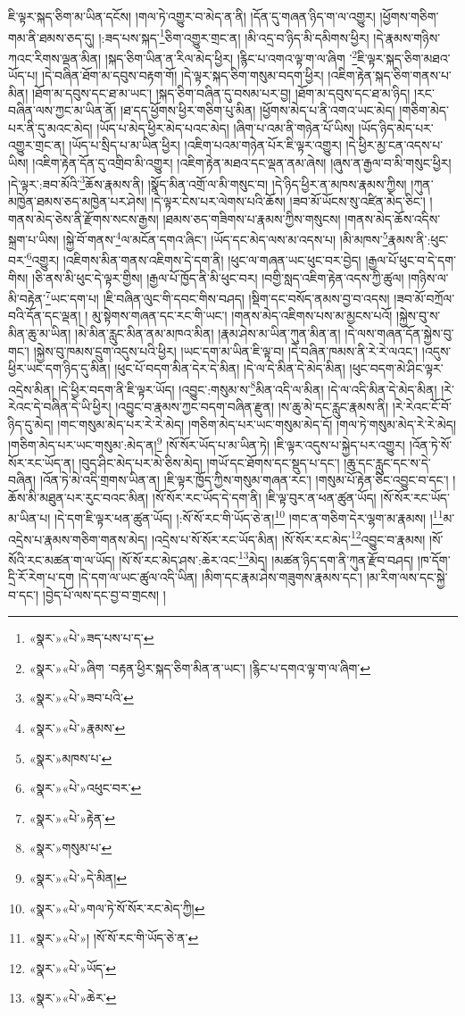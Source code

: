 ཇི་ལྟར་སྐད་ཅིག་མ་ཡིན་དངོས། །གལ་ཏེ་འགྱུར་བ་མེད་ན་ནི། །དོན་དུ་གཞན་ཉིད་ག་ལ་འགྱུར། །ཕྱོགས་གཅིག་གམ་ནི་ཐམས་ཅད་དུ། །:ཟད་པས་སྐད་\footnote{«སྣར་»«པེ་»ཟད་པས་པ་ད་}ཅིག་འགྱུར་གྲང་ན། །མི་འདྲ་བ་ཉིད་མི་དམིགས་ཕྱིར། །དེ་རྣམས་གཉིས་ཀའང་རིགས་ལྡན་མིན། །སྐད་ཅིག་ཡིན་ན་རིལ་མེད་ཕྱིར། །རྙིང་པ་འགའ་ལྟ་ག་ལ་ཞིག ་\footnote{«སྣར་»«པེ་»ཞིག ་བརྟན་ཕྱིར་སྐད་ཅིག་མིན་ན་ཡང་། །རྙིང་པ་དགའ་ལྟ་ག་ལ་ཞིག་}ཇི་ལྟར་སྐད་ཅིག་མཐའ་ཡོད་པ། །དེ་བཞིན་ཐོག་མ་དབུས་བརྟག་གོ། །དེ་ལྟར་སྐད་ཅིག་གསུམ་བདག་ཕྱིར། །འཇིག་རྟེན་སྐད་ཅིག་གནས་པ་མིན། །ཐོག་མ་དབུས་དང་ཐ་མ་ཡང་། །སྐད་ཅིག་བཞིན་དུ་བསམ་པར་བྱ། །ཐོག་མ་དབུས་དང་ཐ་མ་ཉིད། །རང་བཞིན་ལས་ཀྱང་མ་ཡིན་ནོ། །ཐ་དད་ཕྱོགས་ཕྱིར་གཅིག་པུ་མིན། །ཕྱོགས་མེད་པ་ནི་འགའ་ཡང་མེད། །གཅིག་མེད་པར་ནི་དུ་མའང་མེད། །ཡོད་པ་མེད་ཕྱིར་མེད་པའང་མེད། །ཞིག་པ་འམ་ནི་གཉེན་པོ་ཡིས། །ཡོད་ཉིད་མེད་པར་འགྱུར་གྲང་ན། །ཡོད་པ་སྲིད་པ་མ་ཡིན་ཕྱིར། །འཇིག་པའམ་གཉེན་པོར་ཇི་ལྟར་འགྱུར། །དེ་ཕྱིར་མྱ་ངན་འདས་པ་ཡིས། །འཇིག་རྟེན་དོན་དུ་འགྲིབ་མི་འགྱུར། །འཇིག་རྟེན་མཐའ་དང་ལྡན་ནམ་ཞེས། །ཞུས་ན་རྒྱལ་བ་མི་གསུང་ཕྱིར། །དེ་ལྟར་:ཟབ་མོའི་\footnote{«སྣར་»«པེ་»ཟབ་པའི་}ཆོས་རྣམས་ནི། །སྣོད་མིན་འགྲོ་ལ་མི་གསུང་བ། །དེ་ཉིད་ཕྱིར་ན་མཁས་རྣམས་ཀྱིས། །ཀུན་མཁྱེན་ཐམས་ཅད་མཁྱེན་པར་ཤེས། །དེ་ལྟར་ངེས་པར་ལེགས་པའི་ཆོས། །ཟབ་མོ་ཡོངས་སུ་འཛིན་མེད་ཅིང་། །གནས་མེད་ཅེས་ནི་རྫོགས་སངས་རྒྱས། །ཐམས་ཅད་གཟིགས་པ་རྣམས་ཀྱིས་གསུངས། །གནས་མེད་ཆོས་འདིས་སྐྲག་པ་ཡིས། །སྐྱེ་བོ་གནས་\footnote{«སྣར་»«པེ་»རྣམས་}ལ་མངོན་དགའ་ཞིང་། །ཡོད་དང་མེད་ལས་མ་འདས་པ། །མི་མཁས་\footnote{«སྣར་»མཁས་པ་}རྣམས་ནི་:ཕུང་བར་\footnote{«སྣར་»«པེ་»འཕུང་བར་}འགྱུར། །འཇིགས་མིན་གནས་འཇིགས་དེ་དག་ནི། །ཕུང་ལ་གཞན་ཡང་ཕུང་བར་བྱེད། །རྒྱལ་པོ་ཕུང་བ་དེ་དག་གིས། །ཅི་ནས་མི་ཕུང་དེ་ལྟར་གྱིས། །རྒྱལ་པོ་ཁྱོད་ནི་མི་ཕུང་བར། །བགྱི་སླད་འཇིག་རྟེན་འདས་ཀྱི་ཚུལ། །གཉིས་ལ་མི་བརྟེན་\footnote{«སྣར་»«པེ་»རྟེན་}ཡང་དག་པ། །ཇི་བཞིན་ལུང་གི་དབང་གིས་བཤད། །སྡིག་དང་བསོད་ནམས་བྱ་བ་འདས། །ཟབ་མོ་བཀྲོལ་བའི་དོན་དང་ལྡན། །
མུ་སྟེགས་གཞན་དང་རང་གི་ཡང་། །གནས་མེད་འཇིགས་པས་མ་མྱངས་པའོ། །སྐྱེས་བུ་ས་མིན་ཆུ་མ་ཡིན། །མེ་མིན་རླུང་མིན་ནམ་མཁའ་མིན། །རྣམ་ཤེས་མ་ཡིན་ཀུན་མིན་ན། །དེ་ལས་གཞན་དོན་སྐྱེས་བུ་གང་། །སྐྱེས་བུ་ཁམས་དྲུག་འདུས་པའི་ཕྱིར། །ཡང་དག་མ་ཡིན་ཇི་ལྟ་བ། །དེ་བཞིན་ཁམས་ནི་རེ་རེ་ལའང་། །འདུས་ཕྱིར་ཡང་དག་ཉིད་དུ་མིན། །ཕུང་པོ་བདག་མིན་དེར་དེ་མིན། །དེ་ལ་དེ་མིན་དེ་མེད་མིན། །ཕུང་བདག་མེ་ཤིང་ལྟར་འདྲེས་མིན། །དེ་ཕྱིར་བདག་ནི་ཇི་ལྟར་ཡོད། །འབྱུང་:གསུམ་ས་\footnote{«སྣར་»གསུམ་པ་}མིན་འདི་ལ་མིན། །དེ་ལ་འདི་མིན་དེ་མེད་མིན། །རེ་རེའང་དེ་བཞིན་དེ་ཡི་ཕྱིར། །འབྱུང་བ་རྣམས་ཀྱང་བདག་བཞིན་རྫུན། །ས་ཆུ་མེ་དང་རླུང་རྣམས་ནི། །རེ་རེའང་ངོ་བོ་ཉིད་དུ་མེད། །གང་གསུམ་མེད་པར་རེ་རེ་མེད། །གཅིག་མེད་པར་ཡང་གསུམ་མེད་དོ། །གལ་ཏེ་གསུམ་མེད་རེ་རེ་མེད། །གཅིག་མེད་པར་ཡང་གསུམ་:མེད་ན།\footnote{«སྣར་»«པེ་»དེ་མིན།} །སོ་སོར་ཡོད་པ་མ་ཡིན་ཏེ། །ཇི་ལྟར་འདུས་པ་སྐྱེད་པར་འགྱུར། །འོན་ཏེ་སོ་སོར་རང་ཡོད་ན། །བུད་ཤིང་མེད་པར་མེ་ཅིས་མེད། །གཡོ་དང་ཐོགས་དང་སྡུད་པ་དང་། །ཆུ་དང་རླུང་དང་ས་དེ་བཞིན། །འོན་ཏེ་མེ་འདི་གྲགས་ཡིན་ན། །ཇི་ལྟར་ཁྱོད་ཀྱིས་གསུམ་གཞན་རང་། །གསུམ་པོ་རྟེན་ཅིང་འབྱུང་བ་དང་། །ཆོས་མི་མཐུན་པར་རུང་བའང་མིན། །སོ་སོར་རང་ཡོད་དེ་དག་ནི། །ཇི་ལྟ་བུར་ན་ཕན་ཚུན་ཡོད། །སོ་སོར་རང་ཡོད་མ་ཡིན་པ། །དེ་དག་ཇི་ལྟར་ཕན་ཚུན་ཡོད། །:སོ་སོ་རང་གི་ཡོད་ཅེ་ན།\footnote{«སྣར་»«པེ་»གལ་ཏེ་སོ་སོར་རང་མེད་ཀྱི།} །གང་ན་གཅིག་དེར་ལྷག་མ་རྣམས། །\footnote{«སྣར་»«པེ་»། །སོ་སོ་རང་གི་ཡོད་ཅེ་ན་}མ་འདྲེས་པ་རྣམས་གཅིག་གནས་མེད། །འདྲེས་པ་སོ་སོར་རང་ཡོད་མིན། །སོ་སོར་རང་མེད་\footnote{«སྣར་»«པེ་»ཡོད་}འབྱུང་བ་རྣམས། །སོ་སོའི་རང་མཚན་ག་ལ་ཡོད། །སོ་སོ་རང་མེད་ཤས་:ཆེར་འང་\footnote{«སྣར་»«པེ་»ཆེར་}མེད། །མཚན་ཉིད་དག་ནི་ཀུན་རྫོབ་བཤད། །ཁ་དོག་དྲི་རོ་རེག་པ་དག །དེ་དག་ལ་ཡང་ཚུལ་འདི་ཡིན། །མིག་དང་རྣམ་ཤེས་གཟུགས་རྣམས་དང་། །མ་རིག་ལས་དང་སྐྱེ་བ་དང་། །བྱེད་པོ་ལས་དང་བྱ་བ་གྲངས། །
